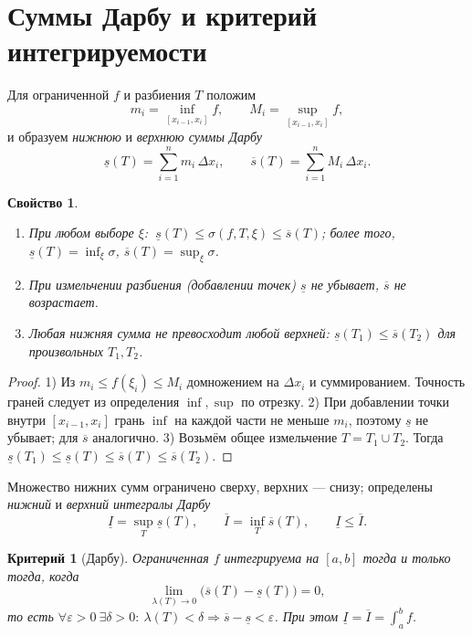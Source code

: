 \documentclass[11pt,a4paper]{article}
\theoremstyle{definition}
\theoremstyle{plain}
\newtheorem{property}[definition]{Свойство}
\newtheorem{criterion}[definition]{Критерий}
\newcommand{\eps}{\varepsilon}
\renewcommand{\le}{\leqslant}
\begin{document}
\section{Суммы Дарбу и критерий интегрируемости}

Для ограниченной $f$ и разбиения $T$ положим
\[
  m_i=\inf_{[x_{i-1},x_i]}f,\qquad M_i=\sup_{[x_{i-1},x_i]}f,
\]
и образуем \emph{нижнюю} и \emph{верхнюю суммы Дарбу}
\[
  \underline s(T)=\sum_{i=1}^n m_i\,\Delta x_i,\qquad
  \overline s(T)=\sum_{i=1}^n M_i\,\Delta x_i .
\]

\begin{property}\leavevmode
\begin{enumerate}[label=\arabic*),leftmargin=*]
  \item При любом выборе $\xi$: $\ \underline s(T)\le\sigma(f,T,\xi)\le\overline s(T)$; более того,
        $\underline s(T)=\inf_\xi\sigma$, $\overline s(T)=\sup_\xi\sigma$.
  \item При измельчении разбиения (добавлении точек) $\underline s$ не убывает, $\overline s$ не
        возрастает.
  \item Любая нижняя сумма не превосходит любой верхней: $\underline s(T_1)\le\overline s(T_2)$
        для произвольных $T_1,T_2$.
\end{enumerate}
\end{property}

\begin{proof}
1) Из $m_i\le f(\xi_i)\le M_i$ домножением на $\Delta x_i$ и суммированием. Точность граней
следует из определения $\inf,\sup$ по отрезку. 2) При добавлении точки внутри $[x_{i-1},x_i]$ грань
$\inf$ на каждой части не меньше $m_i$, поэтому $\underline s$ не убывает; для $\overline s$
аналогично. 3) Возьмём общее измельчение $T=T_1\cup T_2$. Тогда
$\underline s(T_1)\le\underline s(T)\le\overline s(T)\le\overline s(T_2)$.
\end{proof}

Множество нижних сумм ограничено сверху, верхних — снизу; определены \emph{нижний} и
\emph{верхний интегралы Дарбу}
\[
  \underline I=\sup_T \underline s(T),\qquad \overline I=\inf_T \overline s(T),
  \qquad \underline I\le\overline I .
\]

\begin{criterion}[Дарбу]
Ограниченная $f$ интегрируема на $[a,b]$ тогда и только тогда, когда
\[
  \lim_{\lambda(T)\to0}\bigl(\overline s(T)-\underline s(T)\bigr)=0,
\]
то есть $\forall\eps>0\ \exists\delta>0:\ \lambda(T)<\delta\Rightarrow\overline s-\underline s<\eps$.
При этом $\underline I=\overline I=\int_a^b f$.
\end{criterion}
\end{document}
